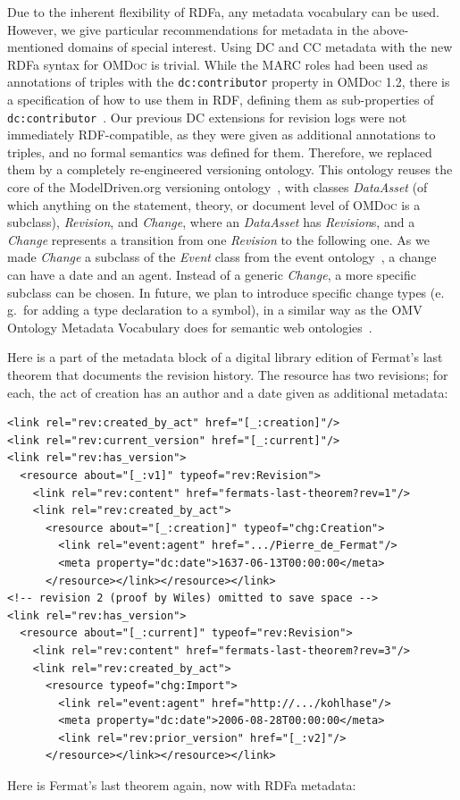 \documentclass{llncs}
\renewcommand{\omdoc}{\textsc{OMDoc}\xspace}
\begin{document}
Due to the inherent flexibility of RDFa, any metadata vocabulary can be used.  However, we
give particular recommendations for metadata in the above-mentioned domains of special
interest.  Using DC and CC metadata with the new RDFa syntax for \omdoc is trivial. %
\ifpublic%
\else%
While the MARC roles had been used as annotations of triples with the
\texttt{dc:contributor} property in {\omdoc} 1.2, there is a specification of how to use
them in RDF, defining them as sub-properties of
\texttt{dc:contributor}~\cite{Johnston:MARC-DC05}.  %
\fi%
Our previous DC extensions for revision logs were not immediately RDF-compatible, as they
were given as additional annotations to triples, and no formal semantics was defined for
them.  Therefore, we replaced them by a completely re-engineered versioning ontology.
This ontology reuses the core of the ModelDriven.org versioning
ontology~\cite{modeldriven.org:VersioningOntology}, with classes \textit{DataAsset} (of
which anything on the statement, theory, or document level of {\omdoc} is a subclass),
\textit{Revision}, and \textit{Change}, where an \textit{DataAsset} has
\textit{Revision}s, and a \textit{Change} represents a transition from one
\textit{Revision} to the following one.  As we made \textit{Change} a subclass of the
\textit{Event} class from the event ontology~\cite{EventOntology:spec}, a change can have
a date and an agent.  Instead of a generic \textit{Change}, a more specific subclass can
be chosen.  In future, we plan to introduce specific change types (e.\,g.\ for adding a
type declaration to a symbol), in a similar way as the OMV Ontology Metadata Vocabulary
does for semantic web ontologies~\cite{OMV:web}.

\ifpublic
Here is a part of the metadata block of a digital library edition of Fermat's last theorem
that documents the revision history.  The resource has two revisions; for each, the act of
creation has an author and a date given as additional metadata:

\begin{lstlisting}
<link rel="rev:created_by_act" href="[_:creation]"/>
<link rel="rev:current_version" href="[_:current]"/>
<link rel="rev:has_version">
  <resource about="[_:v1]" typeof="rev:Revision">
    <link rel="rev:content" href="fermats-last-theorem?rev=1"/>
    <link rel="rev:created_by_act">
      <resource about="[_:creation]" typeof="chg:Creation">
        <link rel="event:agent" href=".../Pierre_de_Fermat"/>
        <meta property="dc:date">1637-06-13T00:00:00</meta>
      </resource></link></resource></link>
<!-- revision 2 (proof by Wiles) omitted to save space -->
<link rel="rev:has_version">
  <resource about="[_:current]" typeof="rev:Revision">
    <link rel="rev:content" href="fermats-last-theorem?rev=3"/>
    <link rel="rev:created_by_act">
      <resource typeof="chg:Import">
        <link rel="event:agent" href="http://.../kohlhase"/>
        <meta property="dc:date">2006-08-28T00:00:00</meta>
        <link rel="rev:prior_version" href="[_:v2]"/>
      </resource></link></resource></link>
\end{lstlisting}
\else
Here is Fermat's last theorem again, now with RDFa metadata:
\end{document}
